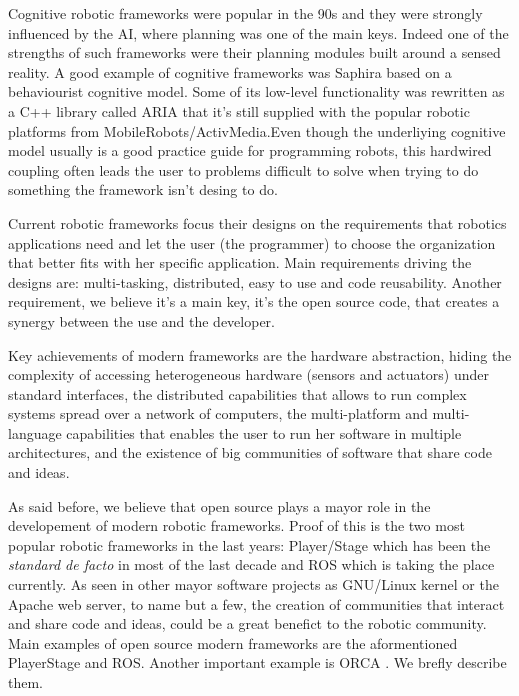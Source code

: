 \documentclass[twocolumn]{svjour3}          %
\begin{document}
Cognitive robotic frameworks were popular in the 90s and they were
strongly influenced by the AI, where planning was one of the main
keys. Indeed one of the strengths of such frameworks were their
planning modules built around a sensed reality. A good example of cognitive
frameworks was Saphira \cite{konolige98} based on a behaviourist
cognitive model. Some of its low-level functionality was rewritten as a
C++ library called ARIA \cite{aria} that it's still supplied with the
popular robotic platforms from MobileRobots/ActivMedia.Even though
the underliying cognitive model usually is a good practice guide for
programming robots, this hardwired coupling often leads the user to
problems difficult to solve when trying to do something the framework
isn't desing to do.

Current robotic frameworks focus their designs on the requirements
that robotics applications need and let the user (the programmer) to
choose the organization that better fits with her specific
application. Main requirements driving the designs are: multi-tasking, distributed, easy to
use and code reusability. Another requirement, we believe it's a main
key, it's the open source code, that creates a synergy between the use
and the developer. 

Key achievements of modern frameworks are the hardware abstraction, hiding the complexity of accessing heterogeneous hardware (sensors and
actuators) under standard interfaces, the distributed capabilities
that allows to run complex systems spread over a network of computers,
the multi-platform and multi-language capabilities that enables the
user to run her software in multiple architectures, and the existence
of big communities of software that share code and ideas.

As said before, we believe that open source plays a mayor role in the
developement of modern robotic frameworks. Proof of this is the two most popular robotic
frameworks in the last years: Player/Stage
\cite{Gerkey03,collet05,vaughan2007} which has been the \textit{standard de
facto} in most of the last decade and ROS \cite{quigley09} which is
taking the place currently. As seen in other mayor software projects
as GNU/Linux kernel or the Apache web server, to name but a few, the
creation of communities that interact and share code and ideas, could
be a great benefict to the robotic community. Main examples of open
source modern frameworks are the aformentioned PlayerStage and
ROS. Another important example is ORCA \cite{brooks05,brooks07}. We
brefly describe them.
\end{document}
